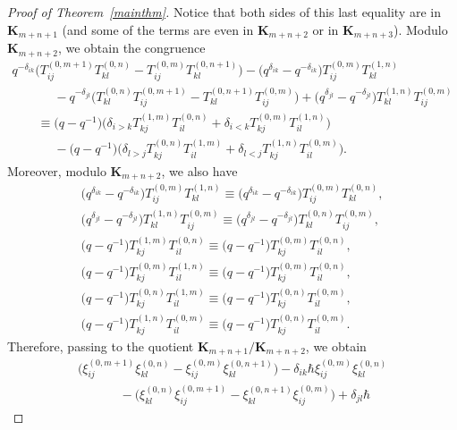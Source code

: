 \documentclass[pdftex]{sigma}
\numberwithin{theorem}{section}
\numberwithin{proposition}{section}
\numberwithin{lemma}{section}
\numberwithin{corollary}{section}
\numberwithin{definition}{section}
\numberwithin{example}{section}
\numberwithin{remark}{section}
\numberwithin{note}{section}
\numberwithin{equation}{section}
\begin{document}
\begin{proof}[Proof of Theorem~\ref{mainthm}]
Notice that both sides of this last equality are in $\mathbf{K}_{m+n+1}$ (and some of the terms are even in
$\mathbf{K}_{m+n+2}$ or in $\mathbf{K}_{m+n+3}$).
Modulo $\mathbf{K}_{m+n+2}$, we obtain the congruence
\begin{gather*}
q^{-\delta_{ik}} \big(T_{ij}^{(0,m+1)} T_{kl}^{(0,n)}- T_{ij}^{(0,m)} T_{kl}^{(0,n+1)} \big) - \big(q^{\delta_{ik}} -
q^{-\delta_{ik}}\big) T_{ij}^{(0,m)} T_{kl}^{(1,n)}
\\
\qquad\phantom{=}{}
  - q^{-\delta_{jl}} \big(T_{kl}^{(0,n)} T_{ij}^{(0,m+1)} - T_{kl}^{(0,n+1)} T_{ij}^{(0,m)} \big) + \big(q^{\delta_{jl}} -
q^{-\delta_{jl}}\big) T_{kl}^{(1,n)} T_{ij}^{(0,m)}
\\
\qquad
\equiv \big(q-q^{-1}\big) \big(  \delta_{i>k} T_{kj}^{(1,m)} T_{il}^{(0,n)} + \delta_{i<k} T_{kj}^{(0,m)} T_{il}^{(1,n)}\big)
\\
\qquad\phantom{=}{}
  - \big(q-q^{-1}\big) \big(\delta_{l>j} T_{kj}^{(0,n)} T_{il}^{(1,m)} + \delta_{l<j} T_{kj}^{(1,n)} T_{il}^{(0,m)}\big).
\end{gather*}
Moreover, modulo $\mathbf{K}_{m+n+2}$, we also have
\begin{gather*}
\big(q^{\delta_{ik}} - q^{-\delta_{ik}}\big) T_{ij}^{(0,m)} T_{kl}^{(1,n)} \equiv \big(q^{\delta_{ik}} - q^{-\delta_{ik}}\big)
T_{ij}^{(0,m)} T_{kl}^{(0,n)},
\\
\big(q^{\delta_{jl}}-q^{-\delta_{jl}}\big) T_{kl}^{(1,n)} T_{ij}^{(0,m)} \equiv \big(q^{\delta_{jl}}-q^{-\delta_{jl}}\big)
T_{kl}^{(0,n)} T_{ij}^{(0,m)},
\\
\big(q-q^{-1}\big) T_{kj}^{(1,m)} T_{il}^{(0,n)} \equiv \big(q-q^{-1}\big)T_{kj}^{(0,m)} T_{il}^{(0,n)},
\\
\big(q-q^{-1}\big) T_{kj}^{(0,m)}
T_{il}^{(1,n)} \equiv \big(q-q^{-1}\big) T_{kj}^{(0,m)} T_{il}^{(0,n)},
\\
\big(q-q^{-1}\big) T_{kj}^{(0,n)} T_{il}^{(1,m)} \equiv \big(q-q^{-1}\big) T_{kj}^{(0,n)} T_{il}^{(0,m)},
\\
\big(q-q^{-1}\big) T_{kj}^{(1,n)}
T_{il}^{(0,m)} \equiv \big(q-q^{-1}\big) T_{kj}^{(0,n)} T_{il}^{(0,m)}.
\end{gather*}
Therefore, passing to the quotient $\mathbf{K}_{m+n+1}/\mathbf{K}_{m+n+2}$, we obtain
\begin{gather*}
\big(\xi_{ij}^{(0,m+1)} \xi_{kl}^{(0,n)} - \xi_{ij}^{(0,m)} \xi_{kl}^{(0,n+1)} \big)- \delta_{ik} \hbar
\xi_{ij}^{(0,m)} \xi_{kl}^{(0,n)}
\\
\qquad\phantom{=}{}
  - \big(\xi_{kl}^{(0,n)} \xi_{ij}^{(0,m+1)} - \xi_{kl}^{(0,n+1)} \xi_{ij}^{(0,m)} \big) + \delta_{jl} \hbar

\end{gather*}
\end{proof}
\end{document}
